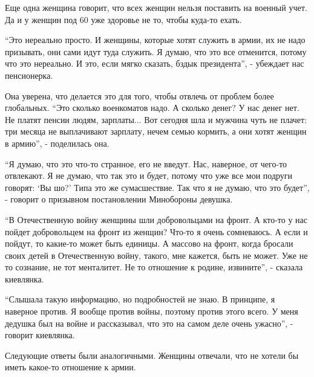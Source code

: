 \begin{multicols}{2}

Еще одна женщина говорит, что всех женщин нельзя поставить на военный учет. Да
и у женщин под 60 уже здоровье не то, чтобы куда-то ехать. 

\enquote{Это нереально просто. И женщины, которые хотят служить в армии, их не надо
призывать, они сами идут туда служить. Я думаю, что это все отменится, потому
что это нереально. И это, если мягко сказать, бздык президента}, - убеждает нас
пенсионерка.

Она уверена, что делается это для того, чтобы отвлечь от проблем более
глобальных. \enquote{Это сколько военкоматов надо. А сколько денег? У нас денег нет. Не
платят пенсии людям, зарплаты... Вот сегодня шла и мужчина чуть не плачет: три
месяца не выплачивают зарплату, нечем семью кормить, а они хотят женщин в
армию}, - поделилась она.


\enquote{Я думаю, что это что-то странное, его не введут. Нас, наверное, от чего-то
отвлекают. Я не думаю, что так это и будет, потому что уже все мои подруги
говорят: \enquote{Вы шо?} Типа это же сумасшествие. Так что я не думаю, что это будет},
- говорит о призывном постановлении Минобороны девушка. 


\enquote{В Отечественную войну женщины шли добровольцами на фронт. А кто-то у нас
пойдет добровольцем на фронт из женщин? Что-то я очень сомневаюсь. А если и
пойдут, то какие-то может быть единицы. А массово на фронт, когда бросали своих
детей в Отечественную войну, такого, мне кажется, быть не может. Уже не то
сознание, не тот менталитет. Не то отношение к родине, извините}, - сказала
киевлянка.


\enquote{Слышала такую информацию, но подробностей не знаю. В принципе, я наверное
против. Я вообще против войны, поэтому против этого всего. У меня дедушка был
на войне и рассказывал, что это на самом деле очень ужасно}, - говорит
киевлянка.


Следующие ответы были аналогичными. Женщины отвечали, что не хотели бы иметь
какое-то отношение к армии.


\end{multicols}
